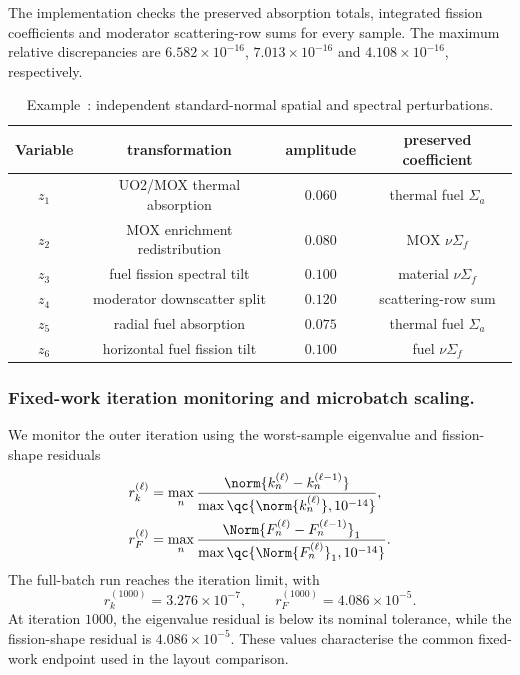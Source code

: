 \documentclass[final]{amsart}
\newcounter{numexample}
\newcommand{\CurrentExample}{Example~\thenumexample}
\begin{document}
The implementation checks the preserved absorption totals, integrated
fission coefficients and moderator scattering-row sums for every
sample. The maximum relative discrepancies are
$6.582\times10^{-16}$, $7.013\times10^{-16}$ and
$4.108\times10^{-16}$, respectively.

\begin{table}[h!]
\centering
\scriptsize
\setlength{\tabcolsep}{4pt}
\begin{tabular}{cccc}
\hline
Variable & transformation & amplitude & preserved coefficient \\
\hline
$z_1$ & UO2/MOX thermal absorption & $0.060$ & thermal fuel $\Sigma_a$ \\
$z_2$ & MOX enrichment redistribution & $0.080$ & MOX $\nu\Sigma_f$ \\
$z_3$ & fuel fission spectral tilt & $0.100$ & material $\nu\Sigma_f$ \\
$z_4$ & moderator downscatter split & $0.120$ & scattering-row sum \\
$z_5$ & radial fuel absorption & $0.075$ & thermal fuel $\Sigma_a$ \\
$z_6$ & horizontal fuel fission tilt & $0.100$ & fuel $\nu\Sigma_f$ \\
\hline
\end{tabular}
\caption{\CurrentExample: independent standard-normal spatial and spectral perturbations.}
\label{tab:pincell_perturbations}
\end{table}

\subsubsection{Fixed-work iteration monitoring and microbatch scaling.}

We monitor the outer iteration using the worst-sample eigenvalue and
fission-shape residuals
\begin{align}
r_k^{(\ell)}
&=
\max_n
\frac{
\norm{k_n^{(\ell)}-k_n^{(\ell-1)}}
}{
\max\qc{\norm{k_n^{(\ell)}},10^{-14}}
},
\label{eq:pincell_keff_residual}
\\
r_F^{(\ell)}
&=
\max_n
\frac{
\Norm{ F_n^{(\ell)}-F_n^{(\ell-1)}}_1
}{
\max\qc{\Norm{ F_n^{(\ell)}}_1,10^{-14}}
}.
\label{eq:pincell_fission_residual}
\end{align}
The full-batch run reaches the iteration limit, with
\[
r_k^{(1000)}
=
3.276\times10^{-7},
\qquad
r_F^{(1000)}
=
4.086\times10^{-5}.
\]
At iteration $1000$, the eigenvalue residual is below its nominal
tolerance, while the fission-shape residual is
$4.086\times10^{-5}$. These values characterise the common fixed-work
endpoint used in the layout comparison.
\end{document}
